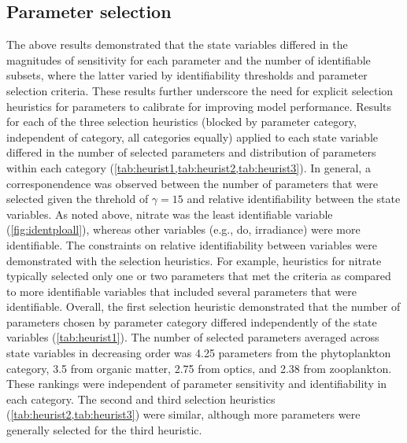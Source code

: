 \documentclass[letterpaper,12pt,oneside]{article}\usepackage[]{graphicx}\usepackage[]{color}
\begin{document}
\subsection{Parameter selection}



The above results demonstrated that the state variables differed in the magnitudes of sensitivity for each parameter and the number of identifiable subsets, where the latter varied by identifiability thresholds and parameter selection criteria.  These results further underscore the need for explicit selection heuristics for parameters to calibrate for improving model performance. Results for each of the three selection heuristics (blocked by parameter category, independent of category, all categories equally) applied to each state variable differed in the number of selected parameters and distribution of parameters within each category (\cref{tab:heurist1,tab:heurist2,tab:heurist3}).  In general, a corresponendence was observed between the number of parameters that were selected given the threhold of $\gamma = 15$ and relative identifiability between the state variables.  As noted above, nitrate was the least identifiable variable (\cref{fig:identploall}), whereas other variables (e.g., \ac{do}, irradiance) were more identifiable.  The constraints on relative identifiability between variables were demonstrated with the selection heuristics.  For example, heuristics for nitrate typically selected only one or two parameters that met the criteria as compared to more identifiable variables that included several parameters that were identifiable. Overall, the first selection heuristic demonstrated that the number of parameters chosen by parameter category differed independently of the state variables (\cref{tab:heurist1}). The number of selected parameters averaged across state variables in decreasing order was 4.25 parameters from the phytoplankton category, 3.5 from organic matter, 2.75 from optics, and 2.38 from zooplankton.  These rankings were independent of parameter sensitivity and identifiability in each category.  The second and third selection heuristics (\cref{tab:heurist2,tab:heurist3}) were similar, although more parameters were generally selected for the third heuristic.
\end{document}
